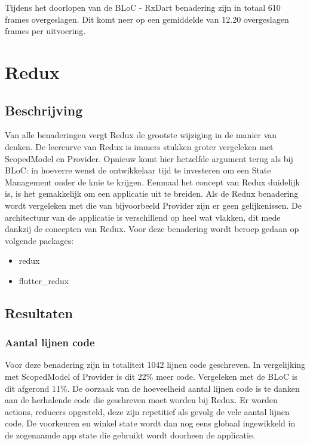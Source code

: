 Tijdens het doorlopen van de BLoC - RxDart benadering zijn in totaal 610 frames overgeslagen. Dit komt neer op een gemiddelde van 12.20 overgeslagen frames per uitvoering.

\section{Redux}
\subsection{Beschrijving}
Van alle benaderingen vergt Redux de grootste wijziging in de manier van denken. De leercurve van Redux is immers stukken groter vergeleken met ScopedModel en Provider. Opnieuw komt hier hetzelfde argument terug als bij BLoC: in hoeverre wenst de ontwikkelaar tijd te investeren om een State Management onder de knie te krijgen. Eenmaal het concept van Redux duidelijk is, is het gemakkelijk om een applicatie uit te breiden. 
Als de Redux benadering wordt vergeleken met die van bijvoorbeeld Provider zijn er geen gelijkenissen. De architectuur van de applicatie is verschillend op heel wat vlakken, dit mede dankzij de concepten van Redux. \newline \newline
Voor deze benadering wordt beroep gedaan op volgende packages: 
\begin{itemize}
    \item{redux}
    \item{flutter\_redux}
\end{itemize}
\subsection{Resultaten}


\subsubsection{Aantal lijnen code}
Voor deze benadering zijn in totaliteit 1042 lijnen code geschreven. In vergelijking met ScopedModel of Provider is dit 22\% meer code. Vergeleken met de BLoC is dit afgerond 11\%. \newline
De oorzaak van de hoeveelheid aantal lijnen code is te danken aan de herhalende code die geschreven moet worden bij Redux. Er worden actions, reducers opgesteld, deze zijn repetitief als gevolg de vele aantal lijnen code. De voorkeuren en winkel state wordt dan nog eens globaal ingewikkeld in de zogenaamde app state die gebruikt wordt doorheen de applicatie.

